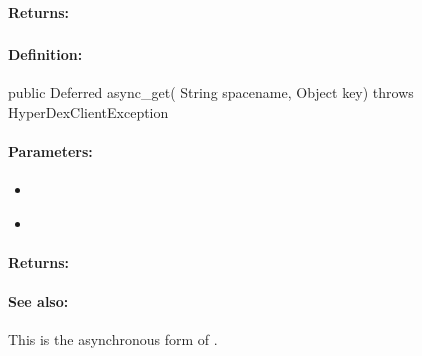 \paragraph{Returns:}


\pagebreak
\subsubsection{}
\label{api:java:async_get}


\paragraph{Definition:}
\begin{javacode}
public Deferred async_get(
        String spacename,
        Object key) throws HyperDexClientException
\end{javacode}

\paragraph{Parameters:}
\begin{itemize}[noitemsep]
\item {}\\

\item {}\\

\end{itemize}

\paragraph{Returns:}


\paragraph{See also:}  This is the asynchronous form of .

\pagebreak
\subsubsection{}
\label{api:java:put}


